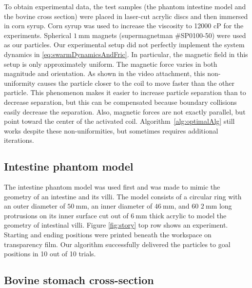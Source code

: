To obtain experimental data, the test samples (the phantom intestine model and the bovine cross section) were placed in laser-cut acrylic discs and then immersed in corn syrup. Corn syrup was used to increase the viscosity to 12000 cP for the experiments. Spherical $\SI{1}{\milli\metre}$ magnets (supermagnetman \#SP0100-50) were used as our particles. Our experimental setup did not perfectly implement the system dynamics in \eqref{eq:swarmDynamicsAndFric}. In particular, the magnetic field in this setup is only approximately uniform. The magnetic force varies in both magnitude and orientation. As shown in the video attachment, this non-uniformity causes the particle closer to the coil to move faster than the other particle. This phenomenon makes it easier to increase particle separation than to decrease separation, but this can be compensated because boundary collisions easily decrease the separation. Also, magnetic forces are not exactly parallel, but point toward the center of the activated coil. Algorithm~\ref{alg:optimalAlg} still works despite these non-uniformities, but sometimes requires additional iterations.
 


\subsection{Intestine phantom model}

The intestine phantom model was used first and was made to mimic the geometry of an intestine and its villi. The model consists of a circular ring with an outer diameter of $\SI{50}{\milli\metre}$, an inner diameter of $\SI{46}{\milli\metre}$, and 60 $\SI{2}{\milli\metre}$ long protrusions on its inner surface cut out of $\SI{6}{\milli\metre}$ thick acrylic to model the geometry of intestinal villi. Figure \ref{fig:story} top row shows an experiment. Starting and ending positions were printed beneath the workspace on transparency film. Our algorithm successfully delivered the particles to goal positions in 10 out of 10 trials.





\subsection{Bovine stomach cross-section}

